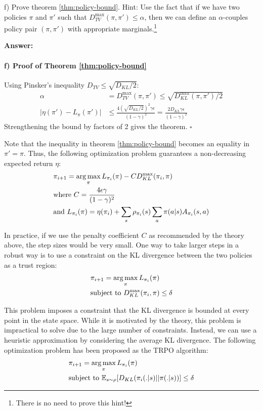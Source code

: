 f) Prove theorem \ref{thm:policy-bound}. Hint: Use the fact that if we have two policies $\pi$ and $\pi'$ such that $D_{TV}^{\max} (\pi, \pi') \le \alpha$, then we can define an $\alpha$-couples policy pair $(\pi, \pi')$ with appropriate marginals.\footnote{There is no need to prove this hint!}


\textbf{Answer:}

\paragraph{f) Proof of Theorem \ref{thm:policy-bound}} Using Pinsker's inequality $D_{TV} \leq \sqrt{D_{KL}/2}$:
\begin{align*}
\alpha &= D_{TV}^{\max}(\pi,\pi') \leq \sqrt{D_{KL}^{\max}(\pi,\pi')/2} \\
|\eta(\pi') - L_\pi(\pi')| &\leq \frac{4(\sqrt{D_{KL}/2})^2\gamma\epsilon}{(1-\gamma)^2} = \frac{2D_{KL}\gamma\epsilon}{(1-\gamma)^2}
\end{align*}
Strengthening the bound by factors of 2 gives the theorem. $\square$


Note that the inequality in theorem \ref{thm:policy-bound} becomes an equality in $\pi' = \pi$. Thus, the following optimization problem guarantees a non-decreasing expected return $\eta$:
\begin{align*}
    &\pi_{i + 1} = \operatorname*{arg\,max}_{\pi} L_{\pi_i}(\pi) - CD_{KL}^{\max}(\pi_i, \pi)\\
    &\text{where } C = \frac{4\epsilon\gamma}{(1-\gamma)^2}\\
    &\text{and } L_{\pi_i}(\pi) = \eta(\pi_i) + \sum_{s}\rho_{\pi_i}(s)\sum_{a}\pi(a|s)A_{\pi_i}(s, a)
\end{align*}

In practice, if we use the penalty coefficient $C$ as recommended by the theory above, the step sizes would be very small. One way to take larger steps in a robust way is to use a constraint on the KL divergence between the two policies as a trust region:
\begin{align*}
    &\pi_{i + 1} = \operatorname*{arg\,max}_{\pi} L_{\pi_i}(\pi)\\
    &\text{subject to } D_{KL}^{\max}(\pi_i, \pi) \le \delta
\end{align*}

This problem imposes a constraint that the KL divergence is bounded at every point in the state space. While it is motivated by the theory, this problem is impractical to solve due to the large number of constraints. Instead, we can use a heuristic approximation by considering the average KL divergence. The following optimization problem has been proposed as the TRPO algorithm:
\begin{align*}
    &\pi_{i + 1} = \operatorname*{arg\,max}_{\pi} L_{\pi_i}(\pi)\\
    &\text{subject to } \mathbb{E}_{s \sim \rho}[D_{KL}(\pi_i (.|s) || \pi(.|s))] \le \delta
\end{align*}